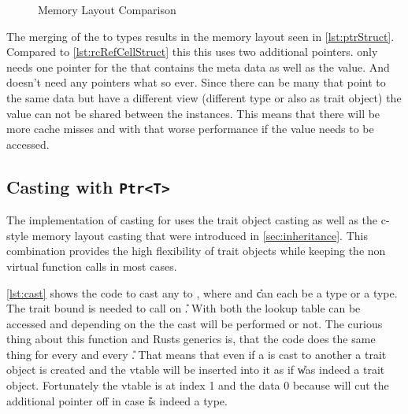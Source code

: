 \documentclass[thesis]{subfiles}
\begin{document}
    \begin{figure}[ht]
      \captionsetup{type=lstlisting}
      \hfill%
      \caption{Memory Layout Comparison}\label{lst:memoryLayout}
    \end{figure}

    The merging of the to types results in the memory layout seen in \autoref{lst:ptrStruct}.
    Compared to \autoref{lst:rcRefCellStruct} this this uses two additional pointers.
    \RcT only needs one pointer for the  that contains the meta data as well as the value.
    And \RefCellT doesn't need any pointers what so ever.
    Since there can be many \PtrTs that point to the same data but have a different view (different type or also as trait object) the value can not be shared between the \PtrT instances.
    This means that there will be more cache misses and with that worse performance if the value needs to be accessed.

  \subsection{Casting with \texttt{Ptr<T>}}
    The implementation of casting for \PtrT uses the trait object casting as well as the c-style memory layout casting that were introduced in \autoref{sec:inheritance}.
    This combination provides the high flexibility of trait objects while keeping the non virtual function calls in most cases.

    

    \autoref{lst:cast} shows the code to cast any \PtrT to , where \T and \U can each be a \struct type or a \trait type.
    The \CastAble trait bound is needed to call  on \U.
    With both \ids the lookup table can be accessed and depending on the \OptionT the cast will be performed or not.
    The curious thing about this function and Rusts generics is, that the code does the same thing for every \T and every \U.
    That means that even if a \struct is cast to another \struct a trait object is created and the vtable will be inserted into it as if \U was indeed a trait object.
    Fortunately the vtable is at index 1 and the data 0 because  will cut the additional pointer off in case \U is indeed a \struct type.
\end{document}
